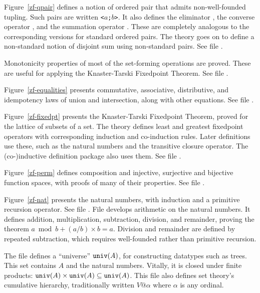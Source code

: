 Figure~\ref{zf-qpair} defines a notion of ordered pair that admits
non-well-founded tupling.  Such pairs are written {\tt<$a$;$b$>}.  It also
defines the eliminator , the converse operator
, and the summation operator .
These are completely analogous to the corresponding versions for standard
ordered pairs.  The theory goes on to define a non-standard notion of
disjoint sum using non-standard pairs.  See file .

Monotonicity properties of most of the set-forming operations are proved.
These are useful for applying the Knaster-Tarski Fixedpoint Theorem.
See file .

Figure~\ref{zf-equalities} presents commutative, associative, distributive,
and idempotency laws of union and intersection, along with other equations.
See file .

Figure~\ref{zf-fixedpt} presents the Knaster-Tarski Fixedpoint Theorem, proved
for the lattice of subsets of a set.  The theory defines least and greatest
fixedpoint operators with corresponding induction and co-induction rules.
Later definitions use these, such as the natural numbers and
the transitive closure operator.  The (co-)inductive definition
package also uses them.    See file .

Figure~\ref{zf-perm} defines composition and injective, surjective and
bijective function spaces, with proofs of many of their properties.
See file .

Figure~\ref{zf-nat} presents the natural numbers, with induction and a
primitive recursion operator.  See file .  File
 develops arithmetic on the natural numbers.  It
defines addition, multiplication, subtraction, division, and remainder,
proving the theorem $a \bmod b + (a/b)\times b = a$.  Division and
remainder are defined by repeated subtraction, which requires well-founded
rather than primitive recursion.

The file  defines a ``universe'' ${\tt univ}(A)$,
for constructing datatypes such as trees.  This set contains $A$ and the
natural numbers.  Vitally, it is closed under finite products: ${\tt
  univ}(A)\times{\tt univ}(A)\subseteq{\tt univ}(A)$.  This file also
defines set theory's cumulative hierarchy, traditionally written $V@\alpha$
where $\alpha$ is any ordinal.

